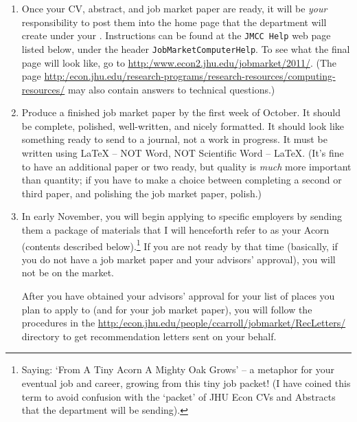 \documentclass{econtex}
\begin{document}
\begin{enumerate}
\item Once your CV, abstract, and job market paper are ready, it will
  be {\it your} responsibility to post them into the home page that
  the department will create under your \Moniker.
  Instructions can be found at the \texttt{JMCC Help} web page listed
  below, under the header \texttt{JobMarketComputerHelp}.  To see what
  the final page will look like, go to
  \url{http:/www.econ2.jhu.edu/jobmarket/2011/}.  (The page
  \url{http:/econ.jhu.edu/research-programs/research-resources/computing-resources/}
  may also contain answers to technical questions.)

\item Produce a finished job market paper by the first week of October.  It should
  be complete, polished, well-written, and nicely formatted.  It
  should look like something ready to send to a journal, not a work in
  progress.  It must be written using {\LaTeX} -- NOT Word, NOT Scientific Word -- {\LaTeX}.  (It's fine to have an
  additional paper or two ready, but quality is {\it much} more
  important than quantity; if you have to make a choice between completing a second or third paper, and 
polishing the job market paper, polish.)
  
\item In early November, you will begin applying to specific employers
  by sending them a package of materials that I will henceforth refer
  to as your Acorn (contents described below).\footnote{Saying: `From
    A Tiny Acorn A Mighty Oak Grows' -- a metaphor for your eventual
    job and career, growing from this tiny job packet! (I have coined
    this term to avoid confusion with the `packet' of JHU Econ CVs and
    Abstracts that the department will be sending).}  If you are not
  ready by that time (basically, if you do not have a job market paper
  and your advisors' approval), you will not be on the market.
  
  After you have obtained your advisors' approval for your list of
  places you plan to apply to (and for your job market paper), you
  will follow the procedures in the
  \url{http:/econ.jhu.edu/people/ccarroll/jobmarket/RecLetters/}
  directory to get recommendation letters sent on your behalf.


\end{enumerate}
\end{document}
